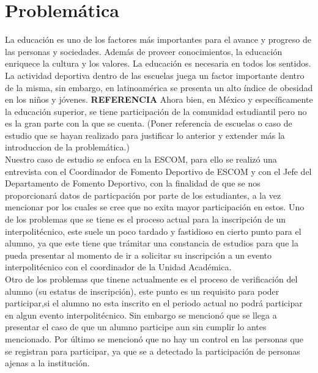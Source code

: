 	\section{Problem\'atica}
	La educación es uno de los factores más importantes para el avance y progreso de las personas y sociedades. Además de proveer conocimientos, la educación enriquece la cultura y los valores. La educación es necesaria en todos los sentidos.\\
	La actividad deportiva dentro de las escuelas juega un factor importante dentro de la misma, sin embargo, en latinoamérica se presenta un alto índice de obesidad en los niños y jóvenes.  \textbf{REFERENCIA}  Ahora bien, en México y específicamente la educación superior, se tiene participación de la comunidad estudiantil pero no es la gran parte con la que se cuenta. 
	(Poner referencia de escuelas o caso de estudio que se hayan realizado para justificar lo anterior y extender más la introduccion de la problemática.)\\
	Nuestro caso de estudio se enfoca en la ESCOM, para ello se realizó una entrevista con el Coordinador de Fomento Deportivo de ESCOM y con el Jefe del Departamento de Fomento Deportivo, con la finalidad de que se nos proporcionará datos de particpación por parte de los estudiantes, a la vez mencionar por los cuales se cree que no exita mayor participación en estos. Uno de los problemas que se tiene es el proceso actual para la inscripción de un interpolitécnico, este suele un poco tardado y fastidioso en cierto punto para el alumno, ya que este tiene que trámitar una constancia de estudios para que la pueda presentar al momento de ir a solicitar su inscripción a un evento interpolitécnico con el coordinador de la Unidad Académica.\\
	Otro de los problemas que tinene actualmente es el proceso de verificación del alumno (su estatus de inscripción), este punto es un requisito para poder participar,si el alumno no esta inscrito en el periodo actual no podrá participar en algun evento interpolitécnico. Sin embargo se mencionó que se llega a presentar el caso de que un alumno participe aun sin cumplir lo antes mencionado.
	Por último se mencionó que no hay un control en las personas que se registran para participar, ya que se a detectado la participación de personas ajenas a la institución. 
	
